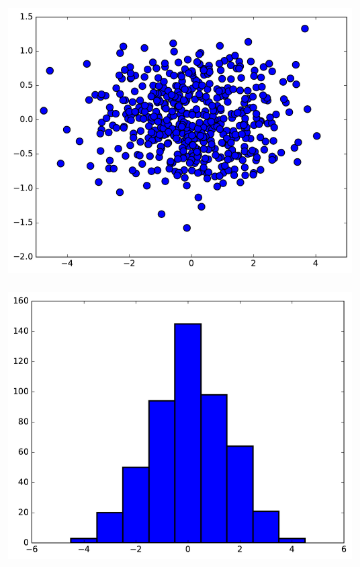 \begin{figure}[H]
\captionsetup[subfigure]{justification=centering}
\centering
\begin{subfigure}{.49\textwidth}
    \centering
    \includegraphics[width=\linewidth]{figures/scatterplot.pdf}
\end{subfigure}
%
\begin{subfigure}{.49\textwidth}
    \centering
    \includegraphics[width=\linewidth]{figures/histogram.pdf}
\end{subfigure}
\end{figure}


